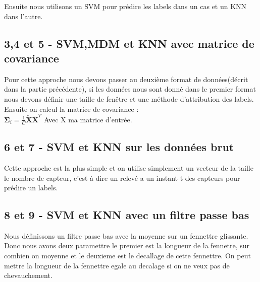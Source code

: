 \documentclass{article}[12pt]
\begin{document}
Ensuite nous utilisons un SVM pour prédire les labels dans un cas et un KNN dans l'autre.
\subsection{3,4 et 5 - SVM,MDM et KNN avec matrice de covariance }
Pour cette approche nous devons passer au deuxième format de données(décrit dans la partie précédente), si les données nous sont donné dans le premier format nous devons définir une taille de fenêtre et une méthode d'attribution des labels.\\
Ensuite on calcul la matrice de covariance :\\
$
\mathbf{\Sigma}_{i}=\frac{1}{C} \tilde{\mathbf{X}} \overline{\mathbf{X}}^{T}
$
Avec X ma matrice d'entrée.
\subsection{6 et 7 - SVM et KNN sur les données brut}
Cette approche est la plus simple et on utilise simplement un vecteur de la taille le nombre de capteur, c'est à dire un relevé a un instant t des capteurs pour prédire un labels.
\subsection{8 et 9 - SVM et KNN avec un filtre passe bas}
Nous définissons un filtre passe bas avec la moyenne sur un fennettre glissante. Donc nous avons deux paramettre le premier est la longueur de la fennetre, sur combien on moyenne et le deuxieme est le decallage de cette fennettre. On peut mettre la longueur de la fennettre egale au decalage si on ne veux pas de chevauchement.
\end{document}
